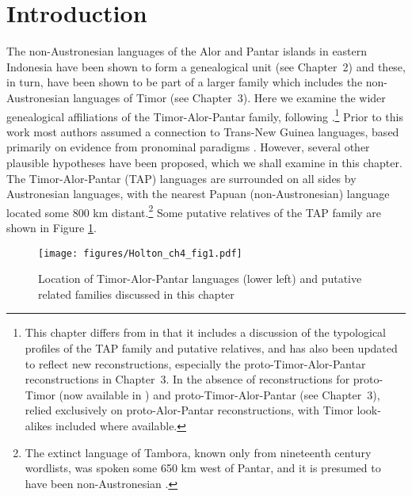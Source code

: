 
 

\section{Introduction} \label{sec:4:1}

\hypertarget{Toc376958109}{}The non-Austronesian languages of the Alor and Pantar islands in eastern Indonesia have been shown to form a genealogical unit (see Chapter~2) and these, in turn, have been shown to be part of a larger family which includes the non-Austronesian languages of Timor (see Chapter~3). Here we examine the wider genealogical affiliations of the Timor-Alor-Pantar family, following \citet{RobinsonEtAl2012reassessing}.\footnote{This chapter differs from \citet{RobinsonEtAl2012reassessing} in that it includes a discussion of the typological profiles of the TAP family and putative relatives, and has also been updated to reflect new reconstructions, especially the proto-Timor-Alor-Pantar reconstructions in Chapter~3. In the absence of reconstructions for proto-Timor (now available in \citealt{SchapperEtAl2012historical}) and proto-Timor-Alor-Pantar (see Chapter~3), \citet{RobinsonEtAl2012reassessing} relied exclusively on proto-Alor-Pantar reconstructions, with Timor look-alikes included
where available. }
Prior to this work most authors assumed a connection to Trans-New Guinea languages, based primarily on evidence from pronominal paradigms \citep{Ross2005}. However, several other plausible hypotheses have been proposed, which we shall examine in this chapter. The Timor-Alor-Pantar (TAP) languages are surrounded on all sides by Austronesian languages, with the nearest Papuan (non-Austronesian) language located some 800 km distant.\footnote{The extinct language of Tambora, known only from nineteenth century wordlists, was spoken some 650 km west of Pantar, and it is presumed to have been non-Austronesian \citep{Donohue2007tambora}.} Some putative relatives of the TAP family are shown in Figure \ref{fig:4:1}.

\begin{figure}[h]

\texttt{[image: figures/Holton\_ch4\_fig1.pdf]}
\caption{Location of Timor-Alor-Pantar languages (lower left) and putative related families discussed in this chapter}
\label{fig:4:1}
\end{figure}

